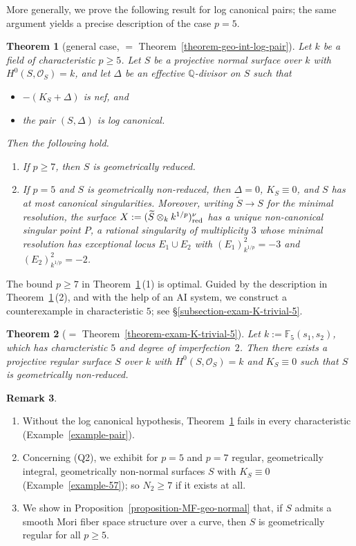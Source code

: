 \documentclass[reqno,oneside]{amsart}
\newtheorem{theorem}{Theorem}[section]
\theoremstyle{definition}
\newtheorem{remark}[theorem]{Remark}
\theoremstyle{plain}
\numberwithin{equation}{section}
\begin{document}
More generally, we prove the following result for log canonical pairs; the same argument yields a precise description of the case $p=5$.
\begin{theorem}[general case, $=$ Theorem~\ref{theorem-geo-int-log-pair}]\label{theorem-main-pair}
  Let $k$ be a field of characteristic $p\ge 5$.
  Let $S$ be a projective normal surface over $k$ with $H^0(S,\mathcal{O}_S)=k$, and let $\Delta$ be an effective $\mathbb Q$-divisor on $S$ such that
  \begin{itemize}
    \item $-(K_S + \Delta)$ is nef, and
    \item the pair $(S,\Delta)$ is log canonical.
  \end{itemize}
  Then the following hold.
  \begin{enumerate}[\rm(1)]
    \item If $p\ge7$, then $S$ is geometrically reduced.
    \item If $p=5$ and $S$ is geometrically non-reduced, then $\Delta=0$, $K_S\equiv 0$, and $S$ has at most canonical singularities.
      Moreover, writing $\widetilde S\to S$ for the minimal resolution, the surface $X:=(\widetilde S\otimes_{k} k^{1/p})_{\rm red}^{\nu}$ has a unique non-canonical singular point $P$, a rational singularity of multiplicity $3$ whose minimal resolution has exceptional locus $E_1 \cup E_2$ with $(E_1)^2_{k^{1/p}} = -3$ and $(E_2)^2_{k^{1/p}} = -2$.
  \end{enumerate}
\end{theorem}

The bound $p\geq 7$ in Theorem~\ref{theorem-main-pair}\,(1) is optimal.
Guided by the description in Theorem~\ref{theorem-main-pair}\,(2), and with the help of an AI system, we construct a counterexample in characteristic $5$; see \S\ref{subsection-exam-K-trivial-5}.

\begin{theorem}[$=$ Theorem~\ref{theorem-exam-K-trivial-5}]\label{theorem-main-counterexample}
  Let $k:=\mathbb F_5(s_1,s_2)$, which has characteristic $5$ and degree of imperfection~$2$.
  Then there exists a projective \emph{regular} surface $S$ over $k$ with $H^0(S,\mathcal O_S)=k$ and $K_S\equiv0$ such that $S$ is geometrically non-reduced.
\end{theorem}

\begin{remark}\label{remark-intro}
  \begin{enumerate}[\rm(1)]
    \item Without the log canonical hypothesis, Theorem~\ref{theorem-main-pair} fails in every characteristic (Example~\ref{example-pair}).
    \item Concerning (Q2), we exhibit for $p=5$ and $p=7$ regular, geometrically integral, geometrically non-normal surfaces $S$ with $K_S \equiv 0$ (Example~\ref{example-57}); so $N_2\ge7$ if it exists at all.
    \item We show in Proposition~\ref{proposition-MF-geo-normal} that, if $S$ admits a smooth Mori fiber space structure over a curve, then $S$ is geometrically regular for all $p\ge5$.
  \end{enumerate}
\end{remark}
\end{document}

